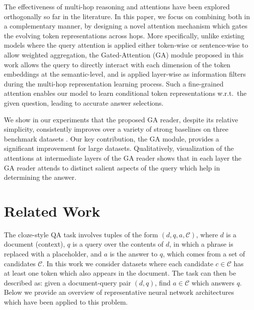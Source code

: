 \documentclass[11pt,a4paper]{article}
\begin{document}
The effectiveness of multi-hop reasoning and attentions have been explored orthogonally so far
in the literature.
In this paper,
we focus on combining both in a complementary manner,
by designing a novel attention mechanism which gates the evolving token representations across hops.
More specifically,
unlike existing models where the query attention
is applied either token-wise \citep{hermann2015teaching, kadlec2016text, chen2016thorough, hill2015goldilocks} or
sentence-wise \citep{weston2014memory, sukhbaatar2015end} to allow weighted aggregation,
the Gated-Attention (GA) module proposed in this work allows the query to directly interact with each dimension
of the token embeddings at the semantic-level,
and is applied layer-wise as information filters during the multi-hop representation learning process.
Such a fine-grained attention enables our model to learn conditional token representations w.r.t.\ the given question,
leading to accurate answer selections. 

We show in our experiments that the proposed GA reader,
despite its relative simplicity,
consistently improves over a variety of strong baselines on three benchmark datasets
. 
Our key contribution, the GA module, provides a significant improvement for large datasets. Qualitatively, visualization of the attentions at intermediate layers of the GA reader shows that in each layer the GA reader attends to distinct salient aspects of the query which help in determining the answer. 

\section{Related Work}
\label{sec:related}
The cloze-style QA task involves tuples of the form $(d,q,a,\mathcal{C})$, where $d$ is a document (context), $q$ is a query over the contents of $d$, in which a phrase is replaced with a placeholder, and $a$ is the answer to $q$, which comes from a set of candidates $\mathcal{C}$. In this work we consider datasets where each candidate $c \in \mathcal{C}$ has at least one token which also appears in the document. The task can then be described as: given a document-query pair $(d,q)$, find $a \in \mathcal{C}$ which answers $q$. Below we provide an overview of representative neural network architectures which have been applied to this problem.
\end{document}
